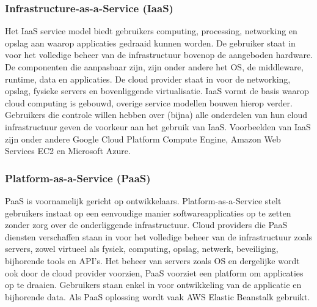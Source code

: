 \subsubsection{Infrastructure-as-a-Service (IaaS)}
Het IaaS service model biedt gebruikers computing, processing, networking en opslag aan waarop applicaties gedraaid kunnen worden. De gebruiker staat in voor het volledige beheer van de infrastructuur bovenop de aangeboden hardware. De componenten die aanpasbaar zijn, zijn onder andere het OS, de middleware, runtime, data en applicaties. De cloud provider staat in voor de networking, opslag, fysieke servers en bovenliggende virtualisatie. IaaS vormt de basis waarop cloud computing is gebouwd, overige service modellen bouwen hierop verder. Gebruikers die controle willen hebben over (bijna) alle onderdelen van hun cloud infrastructuur geven de voorkeur aan het gebruik van IaaS. Voorbeelden van IaaS zijn onder andere Google Cloud Platform Compute Engine, Amazon Web Services EC2 en Microsoft Azure. \autocite{Goyal2014}

\subsubsection{Platform-as-a-Service (PaaS)}
PaaS is voornamelijk gericht op ontwikkelaars. Platform-as-a-Service stelt gebruikers instaat op een eenvoudige manier softwareapplicaties op te zetten zonder zorg over de onderliggende infrastructuur. Cloud providers die PaaS diensten verschaffen staan in voor het volledige beheer van de infrastructuur zoals servers, zowel virtueel als fysiek, computing, opslag, netwerk, beveiliging, bijhorende tools en API's. Het beheer van servers zoals OS en dergelijke wordt ook door de cloud provider voorzien, PaaS voorziet een platform om applicaties op te draaien. Gebruikers staan enkel in voor ontwikkeling van de applicatie en bijhorende data. Als PaaS oplossing wordt vaak AWS Elastic Beanstalk gebruikt. \autocite{Goyal2014}

